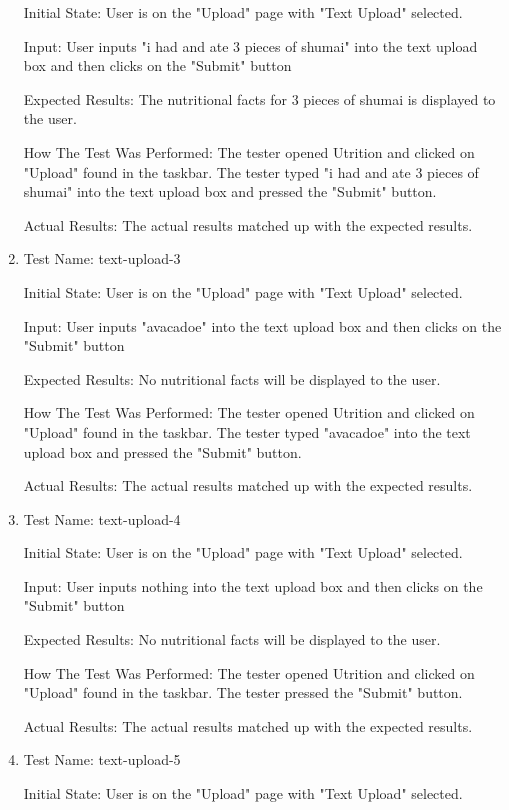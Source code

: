 \documentclass[12pt, titlepage]{article}
\begin{document}
\begin{enumerate}
		Initial State: User is on the "Upload" page with "Text Upload" selected.
		
		Input: User inputs "i had and ate 3 pieces of shumai" into the text upload box and then clicks on the "Submit" button
		
		Expected Results: The nutritional facts for 3 pieces of shumai is displayed to the user.
		
		How The Test Was Performed: The tester opened Utrition and clicked on "Upload" found in the taskbar. The tester typed "i had and ate 3 pieces of shumai" into the text upload box and pressed the "Submit" button.
		
		Actual Results: The actual results matched up with the expected results.
		
		\item{Test Name: text-upload-3}
		
		Initial State: User is on the "Upload" page with "Text Upload" selected.
		
		Input: User inputs "avacadoe" into the text upload box and then clicks on the "Submit" button
		
		Expected Results: No nutritional facts will be displayed to the user.
		
		How The Test Was Performed: The tester opened Utrition and clicked on "Upload" found in the taskbar. The tester typed "avacadoe" into the text upload box and pressed the "Submit" button.
		
		Actual Results: The actual results matched up with the expected results.
		
		\item{Test Name: text-upload-4}
		
		Initial State: User is on the "Upload" page with "Text Upload" selected.
		
		Input: User inputs nothing into the text upload box and then clicks on the "Submit" button
		
		Expected Results: No nutritional facts will be displayed to the user.
		
		How The Test Was Performed: The tester opened Utrition and clicked on "Upload" found in the taskbar. The tester pressed the "Submit" button.
		
		Actual Results: The actual results matched up with the expected results.
	
		\item{Test Name: text-upload-5}
		
		Initial State: User is on the "Upload" page with "Text Upload" selected.
		

\end{enumerate}
\end{document}
